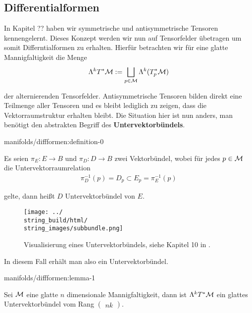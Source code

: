\subsection{Differentialformen}
\label{\detokenize{manifolds/diffformen:differentialformen}}\label{\detokenize{manifolds/diffformen:s-difformen}}
\par
In Kapitel ?? haben wir symmetrische und antisymmetrische Tensoren kennengelernt. Dieses Konzept werden wir nun auf Tensorfelder übetragen um somit Differntialformen zu erhalten. Hierfür betrachten wir für eine glatte Mannigfaltigkeit die Menge
\begin{align*}
\Lambda^k T^\ast\mathcal{M} := \bigsqcup_{p\in\mathcal{M}} \Lambda^k (T^\ast_p\mathcal{M})
\end{align*}
\par
der alternierenden Tensorfelder. Antisymmetrische Tensoren bilden direkt eine Teilmenge aller Tensoren und es bleibt lediglich zu zeigen, dass die Vektorraumstruktur erhalten bleibt. Die Situation hier ist nun anders, man benötigt den abstrakten Begriff des \textbf{Untervektorbündels}.
\begin{definition}{}{manifolds/diffformen:definition-0}



\par
Es seien \(\pi_E:E\to B\) und \(\pi_D:D\to B\) zwei Vektorbündel, wobei für jedes \(p\in\mathcal{M}\) die Untervektorraumrelation
\begin{align*}
\pi_D^{-1}(p) = D_p\subset E_p = \pi_E^{-1}(p)
\end{align*}
\par
gelte, dann heißt \(D\) Untervektorbündel von \(E\).
\end{definition}

\begin{figure}[htbp]
\centering


\noindent\texttt{[image: ../\\string\_build/html/\\string\_images/subbundle.png]}
\caption{Visualisierung eines Untervektorbündels, siehe Kapitel 10 in \cite{Lee03}.}\label{\detokenize{manifolds/diffformen:fig-subbundle}}\end{figure}

\par
In diesem Fall erhält man also ein Untervektorbündel.
\begin{lemma}{}{manifolds/diffformen:lemma-1}



\par
Sei \(\mathcal{M}\) eine glatte \(n\) dimensionale Mannigfaltigkeit, dann ist \(\Lambda^k T^\ast\mathcal{M}\) ein glattes Untervektorbündel vom Rang \(\begin{pmatrix} n k \end{pmatrix}\).
\end{lemma}

